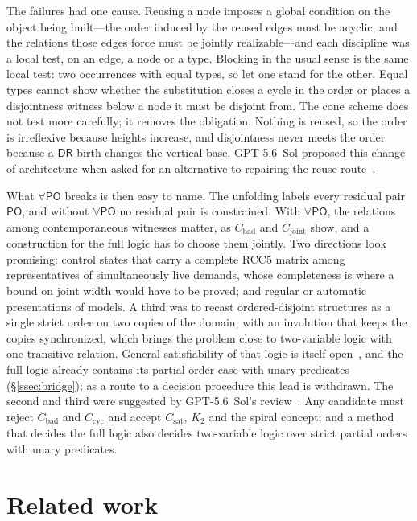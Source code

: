 \documentclass[11pt]{article}
\newcommand{\DR}{\mathsf{DR}}
\newcommand{\PO}{\mathsf{PO}}
\theoremstyle{plain}
\theoremstyle{definition}
\begin{document}
The failures had one cause. Reusing a node imposes a global condition on the
object being built---the order induced by the reused edges must be acyclic, and
the relations those edges force must be jointly realizable---and each discipline
was a local test, on an edge, a node or a type. Blocking in the usual sense is
the same local test: two occurrences with equal types, so let one stand for the
other. Equal types cannot show whether the substitution closes a cycle in the
order or places a disjointness witness below a node it must be disjoint from.
The cone scheme does not test more carefully; it removes the obligation. Nothing
is reused, so the order is irreflexive because heights increase, and
disjointness never meets the order because a $\DR$ birth changes the vertical
base. GPT-5.6~Sol proposed this change of architecture when asked for an
alternative to repairing the reuse route~\cite{GPT56Sol}.

What $\forall\PO$ breaks is then easy to name. The unfolding labels every
residual pair $\PO$, and without $\forall\PO$ no residual pair is constrained.
With $\forall\PO$, the relations among contemporaneous witnesses matter, as
$C_{\mathrm{bad}}$ and $C_{\mathrm{joint}}$ show, and a construction for the
full logic has to choose them jointly. Two directions look promising: control
states that carry a complete RCC5 matrix among representatives of
simultaneously live demands, whose completeness is where a bound on joint width
would have to be proved; and regular or automatic presentations of models. A
third was to recast ordered-disjoint structures as a single strict order on two
copies of the domain, with an involution that keeps the copies synchronized,
which brings the problem close to two-variable logic with one transitive
relation. General satisfiability of that logic is itself
open~\cite{SzwastTendera2018,MarzecTendera2026}, and the full logic already
contains its partial-order case with unary predicates (\S\ref{ssec:bridge});
as a route to a decision procedure this lead is withdrawn. The second and third
were suggested by GPT-5.6~Sol's review~\cite{GPT56SolReview}. Any candidate
must reject $C_{\mathrm{bad}}$ and $C_{\mathrm{cyc}}$ and accept
$C_{\mathrm{sat}}$, $K_2$ and the spiral concept; and a method that decides the
full logic also decides two-variable logic over strict partial orders with
unary predicates.

\section{Related work}
\label{sec:related}
\end{document}
